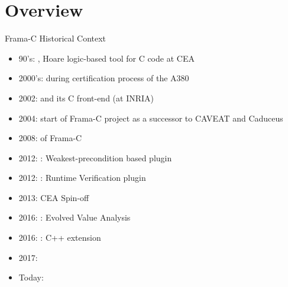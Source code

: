 \section{Overview}
\begin{frame}[fragile]{Frama-C Historical Context}
\begin{itemize}
\item 90's: , Hoare logic-based tool for C code at CEA

\item 2000's:  during certification process of
  the A380 

  \pause

\item 2002:  and its C front-end  (at INRIA)
  
\item 2004: start of Frama-C project as a successor to CAVEAT and
  Caduceus

  \pause

  
\item 2008:  of Frama-C 

\item {2012:  : Weakest-precondition based plugin}

\item {2012: : Runtime Verification plugin}

  \pause
  
\item {2013: CEA Spin-off }

  \pause
  
\item 2016: : Evolved Value Analysis

\item 2016: : C++ extension

\item 2017:  

\item Today:  
\end{itemize}
\end{frame}
